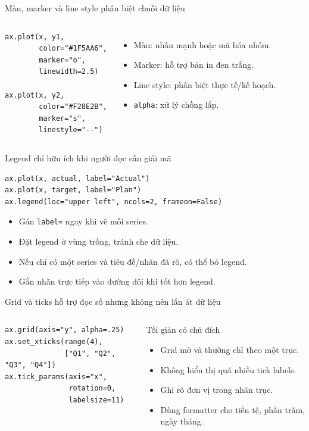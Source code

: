 \documentclass[aspectratio=169,12pt]{beamer}
\begin{document}
\begin{frame}[fragile]{Màu, marker và line style phân biệt chuỗi dữ liệu}
\begin{columns}[T,onlytextwidth]
\begin{lstlisting}[style=py]
ax.plot(x, y1,
        color="#1F5AA6",
        marker="o",
        linewidth=2.5)

ax.plot(x, y2,
        color="#F28E2B",
        marker="s",
        linestyle="--")
\end{lstlisting}
\begin{itemize}
  \item Màu: nhấn mạnh hoặc mã hóa nhóm.
  \item Marker: hỗ trợ bản in đen trắng.
  \item Line style: phân biệt thực tế/kế hoạch.
  \item \texttt{alpha}: xử lý chồng lấp.
\end{itemize}
\end{columns}
\end{frame}

\begin{frame}[fragile]{Legend chỉ hữu ích khi người đọc cần giải mã}
\begin{lstlisting}[style=py]
ax.plot(x, actual, label="Actual")
ax.plot(x, target, label="Plan")
ax.legend(loc="upper left", ncols=2, frameon=False)
\end{lstlisting}
\begin{itemize}
  \item Gán \texttt{label=} ngay khi vẽ mỗi series.
  \item Đặt legend ở vùng trống, tránh che dữ liệu.
  \item Nếu chỉ có một series và tiêu đề/nhãn đã rõ, có thể bỏ legend.
  \item Gắn nhãn trực tiếp vào đường đôi khi tốt hơn legend.
\end{itemize}
\end{frame}

\begin{frame}[fragile]{Grid và ticks hỗ trợ đọc số nhưng không nên lấn át dữ liệu}
\begin{columns}[T,onlytextwidth]
\begin{lstlisting}[style=py]
ax.grid(axis="y", alpha=.25)
ax.set_xticks(range(4),
              ["Q1", "Q2", "Q3", "Q4"])
ax.tick_params(axis="x",
               rotation=0,
               labelsize=11)
\end{lstlisting}
\begin{block}{Tối giản có chủ đích}
\begin{itemize}
  \item Grid mờ và thường chỉ theo một trục.
  \item Không hiển thị quá nhiều tick labels.
  \item Ghi rõ đơn vị trong nhãn trục.
  \item Dùng formatter cho tiền tệ, phần trăm, ngày tháng.
\end{itemize}
\end{block}
\end{columns}
\end{frame}
\end{document}
